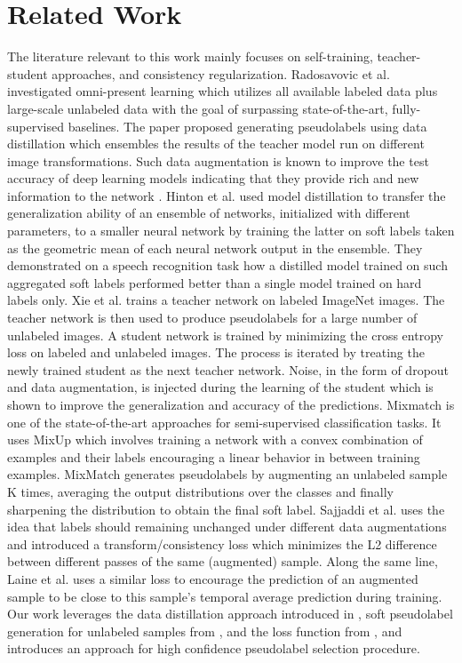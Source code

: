 \documentclass{article}
\begin{document}
\section{Related Work}
The literature relevant to this work mainly focuses on self-training, teacher-student approaches, and consistency regularization. Radosavovic et al. \cite{Radosavovic_2018_CVPR} investigated omni-present learning which utilizes all available labeled data plus large-scale unlabeled data with the goal of surpassing state-of-the-art, fully-supervised baselines. The paper proposed generating pseudolabels using data distillation which ensembles the results of the teacher model run on different image transformations. Such data augmentation is known to improve the test accuracy of deep learning models indicating that they provide rich and new information to the network \cite{KrizhevskyImageNetNetworks}. Hinton et al. \cite{hinton2015distilling} used model distillation to transfer the generalization ability of an ensemble of networks, initialized with different parameters, to a smaller neural network by training the latter on soft labels taken as the geometric mean of each neural network output in the ensemble. They demonstrated on a speech recognition task how a distilled model trained on such aggregated soft labels performed better than a single model trained on hard labels only. Xie et al. \cite{xie2019selftraining} trains a teacher network on labeled ImageNet images. The teacher network is then used to produce pseudolabels for a large number of unlabeled images. A student network is trained by minimizing the cross entropy loss on labeled and unlabeled images. The process is iterated by treating the newly trained student as the next teacher network. Noise, in the form of dropout and data augmentation, is injected during the learning of the student which is shown to improve the generalization and accuracy of the predictions. Mixmatch \cite{Berthelot2019MixMatch:Learning} is one of the state-of-the-art approaches for semi-supervised classification tasks. It uses MixUp \cite{Zhang2017Mixup:Minimization} which involves training a network with a convex combination of examples and their labels encouraging a linear behavior in between training examples. MixMatch generates pseudolabels by augmenting an unlabeled sample K times, averaging the output distributions over the classes and finally sharpening the distribution to obtain the final soft label. Sajjaddi et al. \cite{Sajjadi2016RegularizationLearning} uses the idea that labels should remaining unchanged under different data augmentations and introduced a transform/consistency loss which minimizes the L2 difference between different passes of the same (augmented) sample. Along the same line, Laine et al. \cite{Laine2016TemporalLearning} uses a similar loss to encourage the prediction of an augmented sample to be close to this sample's temporal average prediction during training.
\\
Our work leverages the data distillation approach introduced in \cite{Radosavovic_2018_CVPR}, soft pseudolabel generation for unlabeled samples from \cite{hinton2015distilling}, and the loss function from \cite{Berthelot2019MixMatch:Learning}, and introduces an approach for high confidence pseudolabel selection procedure.
\end{document}
